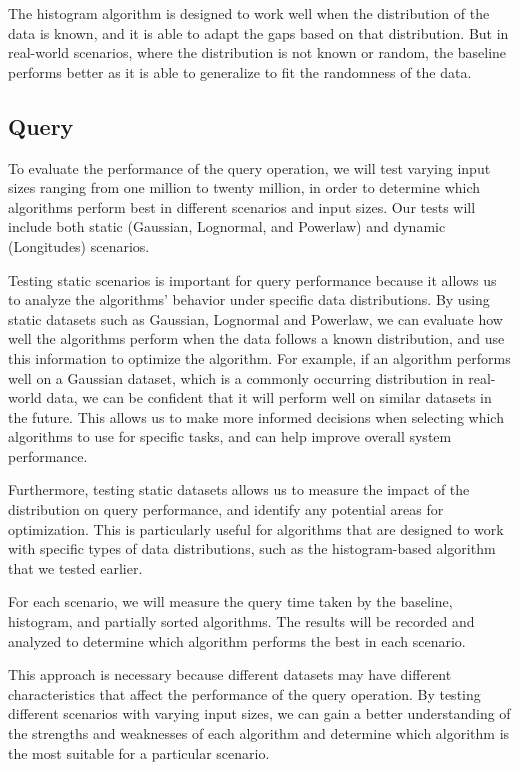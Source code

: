 The histogram algorithm is designed to work well when the distribution of the data is known, and it is able to adapt the gaps based on that distribution. But in real-world scenarios, where the distribution is not known or random, the baseline performs better as it is able to generalize to fit the randomness of the data. 

\subsection{Query}
To evaluate the performance of the query operation, we will test varying input sizes ranging from one million to twenty million, in order to determine which algorithms perform best in different scenarios and input sizes. Our tests will include both static (Gaussian, Lognormal, and Powerlaw) and dynamic (Longitudes) scenarios.

Testing static scenarios is important for query performance because it allows us to analyze the algorithms' behavior under specific data distributions. By using static datasets such as Gaussian, Lognormal and Powerlaw, we can evaluate how well the algorithms perform when the data follows a known distribution, and use this information to optimize the algorithm. For example, if an algorithm performs well on a Gaussian dataset, which is a commonly occurring distribution in real-world data, we can be confident that it will perform well on similar datasets in the future. This allows us to make more informed decisions when selecting which algorithms to use for specific tasks, and can help improve overall system performance.

Furthermore, testing static datasets allows us to measure the impact of the distribution on query performance, and identify any potential areas for optimization. This is particularly useful for algorithms that are designed to work with specific types of data distributions, such as the histogram-based algorithm that we tested earlier.

For each scenario, we will measure the query time taken by the baseline, histogram, and partially sorted algorithms. The results will be recorded and analyzed to determine which algorithm performs the best in each scenario.

This approach is necessary because different datasets may have different characteristics that affect the performance of the query operation. By testing different scenarios with varying input sizes, we can gain a better understanding of the strengths and weaknesses of each algorithm and determine which algorithm is the most suitable for a particular scenario.

